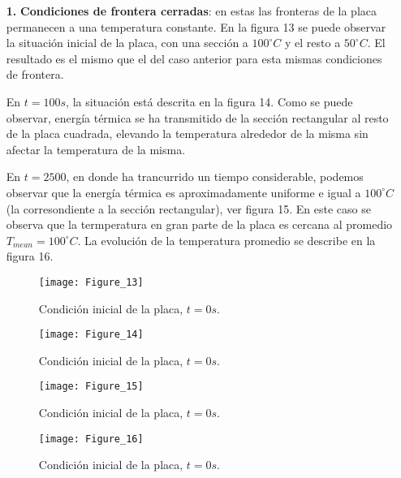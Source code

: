 \documentclass{article}
\begin{document}
\begin{itemize}

\item[\textbf{1.}] \textbf{Condiciones de frontera cerradas}: en estas las fronteras de la placa permanecen a una temperatura constante. En la figura 13 se puede observar la situaci\'on inicial de la placa, con una secci\'on a $100^{\circ} C$ y el resto a $50^{\circ}C$. El resultado es el mismo que el del caso anterior para esta mismas condiciones de frontera.

En $t = 100 s$, la situaci\'on est\'a descrita en la figura 14. Como se puede observar,  energ\'ia t\'ermica se ha transmitido de la secci\'on rectangular al resto de la placa cuadrada, elevando la temperatura alrededor de la misma sin afectar la temperatura de la misma.

En $t = 2500$, en donde ha trancurrido un tiempo considerable, podemos observar que la energ\'ia t\'ermica es aproximadamente uniforme e igual a $100 ^{\circ} C$ (la corresondiente a la secci\'on rectangular), ver figura 15. En este caso se observa que la termperatura  en gran parte de la placa es cercana al promedio $T_{mean} = 100 ^{\circ} C$. La evoluci\'on  de la temperatura promedio se describe en la figura 16.

\begin{figure}
\begin{center}
\texttt{[image: Figure\_13]}
\end{center}
\caption{Condici\'on inicial de la placa, $t = 0 s$.}
\end{figure}

\begin{figure}
\begin{center}
\texttt{[image: Figure\_14]}
\end{center}
\caption{Condici\'on inicial de la placa, $t = 0 s$.}
\end{figure}

\begin{figure}
\begin{center}
\texttt{[image: Figure\_15]}
\end{center}
\caption{Condici\'on inicial de la placa, $t = 0 s$.}
\end{figure}

\begin{figure}
\begin{center}
\texttt{[image: Figure\_16]}
\end{center}
\caption{Condici\'on inicial de la placa, $t = 0 s$.}
\end{figure}


\end{itemize}
\end{document}

